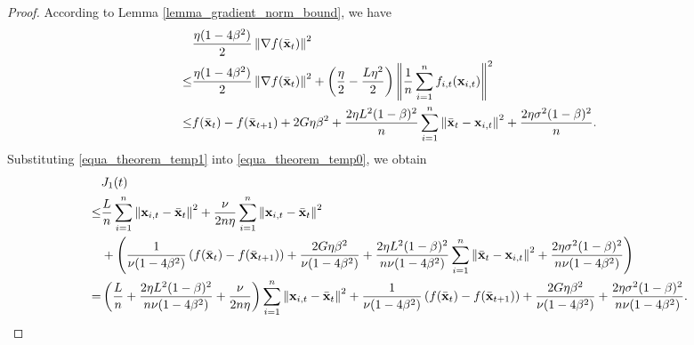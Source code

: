 \documentclass{article}
\begin{document}
\begin{proof}
According to Lemma \ref{lemma_gradient_norm_bound}, we have
\begin{align}
\nonumber
& \frac{\eta(1-4\beta^2)}{2}\left\lVert\nabla f(\bar{{\bf x}}_t)\right\rVert^2  \\ \nonumber
\le & \frac{\eta(1-4\beta^2)}{2}\left\lVert\nabla f(\bar{{\bf x}}_t)\right\rVert^2 + \left( \frac{\eta}{2} - \frac{L\eta^2}{2} \right)\left\lVert\frac{1}{n}\sum_{i=1}^n f_{i,t}({\bf x}_{i,t})\right\rVert^2 \\ \label{equa_theorem_temp1}
\le & f(\bar{{\bf x}}_t) - f(\bar{{\bf x}}_{t+1}) + 2G\eta\beta^2 +  \frac{2\eta L^2(1-\beta)^2}{n}\sum_{i=1}^n\left\lVert\bar{{\bf x}}_t - {\bf x}_{i,t} \right\rVert^2 + \frac{2\eta \sigma^2 (1-\beta)^2}{n}.
\end{align} Substituting \eqref{equa_theorem_temp1} into \eqref{equa_theorem_temp0}, we obtain
\begin{align}
\nonumber
& J_1(t) \\ \nonumber 
\le & \frac{L}{n}\sum_{i=1}^n \left\lVert{\bf x}_{i,t} - \bar{{\bf x}}_t\right\rVert^2 + \frac{\nu}{2n\eta}\sum_{i=1}^n\left\lVert{\bf x}_{i,t} - \bar{{\bf x}}_t \right\rVert^2 \\ \nonumber 
&  + \left(  \frac{1}{\nu(1-4\beta^2)}\left( f(\bar{{\bf x}}_t) - f(\bar{{\bf x}}_{t+1}) \right) + \frac{2G\eta\beta^2}{\nu(1-4\beta^2)} +  \frac{2\eta L^2(1-\beta)^2}{n\nu(1-4\beta^2)}\sum_{i=1}^n\left\lVert\bar{{\bf x}}_t - {\bf x}_{i,t} \right\rVert^2 + \frac{2\eta \sigma^2 (1-\beta)^2}{n\nu(1-4\beta^2)}  \right) \\ \nonumber
= & \left(  \frac{L}{n} + \frac{2\eta L^2(1-\beta)^2}{n\nu(1-4\beta^2)} + \frac{\nu}{2n\eta}  \right)\sum_{i=1}^n\left\lVert{\bf x}_{i,t} - \bar{{\bf x}}_t \right\rVert^2 + \frac{1}{\nu(1-4\beta^2)}\left( f(\bar{{\bf x}}_t) - f(\bar{{\bf x}}_{t+1}) \right) + \frac{2G\eta\beta^2}{\nu(1-4\beta^2)} + \frac{2\eta \sigma^2 (1-\beta)^2}{n\nu(1-4\beta^2)}.
\end{align}


\end{proof}
\end{document}

